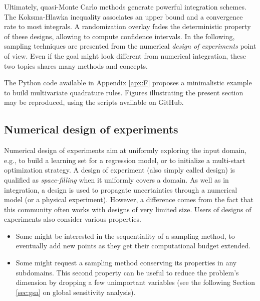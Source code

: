 Ultimately, quasi-Monte Carlo methods generate powerful integration schemes. 
The Koksma-Hlawka inequality associates an upper bound and a convergence rate to most integrals. 
A randomization overlay fades the deterministic property of these designs, allowing to compute confidence intervals. 
In the following, sampling techniques are presented from the numerical \textit{design of experiments} point of view. 
Even if the goal might look different from numerical integration, these two topics shares many methods and concepts. 


\begin{otexample}
    The Python code available in Appendix \ref{apx:F} proposes a minimalistic \ot example to build multivariate quadrature rules. 
    Figures illustrating the present section may be reproduced, using the \ot scripts available on GitHub\footnotemark.  
\end{otexample}

\subsection{Numerical design of experiments}
Numerical design of experiments aim at uniformly exploring the input domain, e.g., to build a learning set for a regression model, or to initialize a multi-start optimization strategy. 
A design of experiment (also simply called design) is qualified as \textit{space-filling} when it uniformly covers a domain. 
As well as in integration, a design is used to propagate uncertainties through a numerical model (or a physical experiment). 
However, a difference comes from the fact that this community often works with designs of very limited size. 
Users of designs of experiments also consider various properties. 
\begin{itemize}
    \item Some might be interested in the sequentiality of a sampling method, to eventually add new points as they get their computational budget extended. 
    \item Some might request a sampling method conserving its properties in any subdomains. 
    This second property can be useful to reduce the problem's dimension by dropping a few unimportant variables (see the following Section \ref{sec:gsa} on global sensitivity analysis).
\end{itemize}


